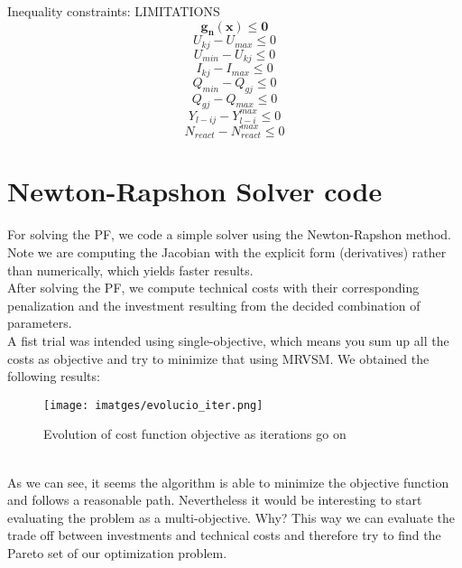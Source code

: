 \documentclass{article}
\begin{document}

Inequality constraints: LIMITATIONS
\\
\[\mathbf{g_n(x)\leq0}\]
\[U_{kj}-U_{max}\leq0\]
\[U_{min}-U_{kj}\leq0\]
\[I_{kj}-I_{max}\leq0\]
\[Q_{min}-Q_{gj}\leq0\]
\[Q_{gj}-Q_{max}\leq0\]
\[Y_{l-ij}-Y_{l-i}^{max}\leq0\]
\[N_{react}-N_{react}^{max}\leq0\]

\newpage
\section{Newton-Rapshon Solver code
}
For solving the PF, we code a simple solver using the Newton-Rapshon method. Note we are computing the Jacobian with the explicit form (derivatives) rather than numerically, which yields faster results.\\
After solving the PF, we compute technical costs with their corresponding penalization and the investment resulting from the decided combination of parameters.\\
A fist trial was intended using single-objective, which means you sum up all the costs as objective and try to minimize that using MRVSM. We obtained the following results:
\begin{figure}[h] %
    \centering
	\texttt{[image: imatges/evolucio\_iter.png]}
	\caption{Evolution of cost function objective as iterations go on}
	\label{fig:binhkorn} %
\end{figure}\\

As we can see, it seems the algorithm is able to minimize the objective function and follows a reasonable path. Nevertheless it would be interesting to start evaluating the problem as a multi-objective. Why? This way we can evaluate the trade off between investments and technical costs and therefore try to find the Pareto set of our optimization problem.\\
\end{document}
